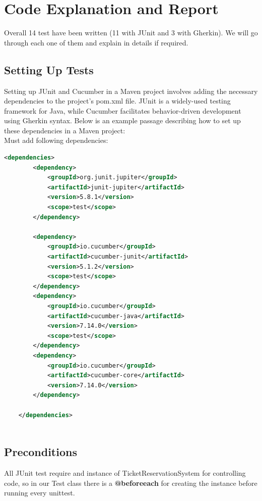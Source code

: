 \documentclass{article}
\begin{document}
\pagebreak


\section{Code Explanation and Report}
 Overall 14 test have been written (11 with JUnit and 3 with Gherkin). We will go through each one of them and explain in details if required.
 
 \bigskip
 
 \subsection{Setting Up Tests}
Setting up JUnit and Cucumber in a Maven project involves adding the necessary dependencies to the project's pom.xml file. JUnit is a widely-used testing framework for Java, while Cucumber facilitates behavior-driven development using Gherkin syntax. Below is an example passage describing how to set up these dependencies in a Maven project:\\

Must add following dependencies:
 \begin{codebox}
 \begin{lstlisting}[language=xml]
        <dependencies>
        <dependency>
            <groupId>org.junit.jupiter</groupId>
            <artifactId>junit-jupiter</artifactId>
            <version>5.8.1</version>
            <scope>test</scope>
        </dependency>

        <dependency>
            <groupId>io.cucumber</groupId>
            <artifactId>cucumber-junit</artifactId>
            <version>5.1.2</version>
            <scope>test</scope>
        </dependency>
        <dependency>
            <groupId>io.cucumber</groupId>
            <artifactId>cucumber-java</artifactId>
            <version>7.14.0</version>
            <scope>test</scope>
        </dependency>
        <dependency>
            <groupId>io.cucumber</groupId>
            <artifactId>cucumber-core</artifactId>
            <version>7.14.0</version>
        </dependency>

    </dependencies>
    
 \end{lstlisting}
 \end{codebox}
 
 \subsection{Preconditions}
 All JUnit test require and instance of TicketReservationSystem for controlling code, so in our Test class there is a \textbf{@beforeeach} for creating the instance before running every unittest. 
 
\end{document}
